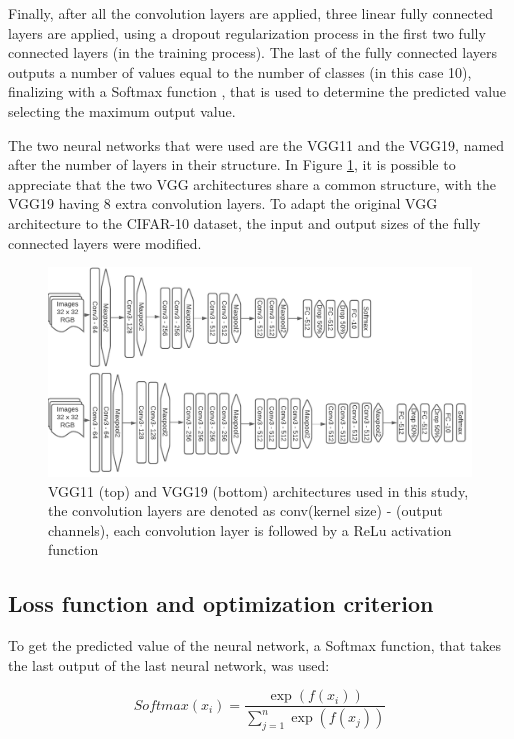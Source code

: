 \documentclass[10pt,twocolumn,letterpaper]{article}
\begin{document}
Finally, after all the convolution layers are applied, three linear fully connected layers are applied, using a dropout regularization process in the first two fully connected layers (in the training process). The last of the fully connected layers outputs a number of values equal to the number of classes (in this case 10), finalizing with a Softmax function \cite{Simonyan2015}, that is used to determine the predicted value selecting the maximum output value.

The two neural networks that were used are the VGG11 and the VGG19, named after the number of layers in their structure. In Figure \ref{fig:vgg}, it is possible to appreciate that the two VGG architectures share a common structure, with the VGG19 having 8 extra convolution layers. To adapt the original VGG architecture to the CIFAR-10 dataset, the input and output sizes of the fully connected layers were modified. 

\begin{figure}[h]
	\begin{center}
		\includegraphics[width=0.9\linewidth]{VGG.pdf}
	
		\caption{VGG11 (top) and VGG19 (bottom) architectures used in this study, the convolution layers are denoted as conv(kernel size) - (output channels), each convolution layer is followed by a ReLu activation function \cite{Simonyan2015}}
		\label{fig:vgg}
	\end{center}
\end{figure}

\subsection{Loss function and optimization criterion}

To get the predicted value of the neural network, a Softmax function, that takes the last output of the last neural network, was used:

\begin{equation}
	{Softmax}(x_{i}) = \frac{\exp(f(x_i))}{\sum_{j=1}^{n} \exp(f(x_j))}
\end{equation}
\end{document}
